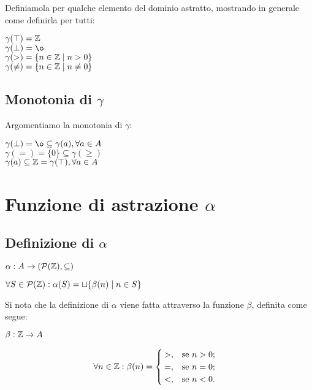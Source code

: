 \documentclass[a4paper, 12pt, oneside,fleqn]{book}
\begin{document}
Definiamola per qualche elemento del dominio astratto, mostrando in generale come definirla per tutti:
\begin{center}
	$ \gamma(\top) = \mathbb{Z} $ \\
	$ \gamma(\bot) = \o $ \\
	$ \gamma(>) = \{ n \in \mathbb{Z} \mid n > 0 \} $ \\
	$ \gamma(\neq) = \{ n \in \mathbb{Z} \mid n \neq 0 \} $
\end{center}

\subsection{Monotonia di $\gamma$}
Argomentiamo la monotonia di $\gamma$:
\begin{center}
	$ \gamma(\bot) = \o \subseteq \gamma(a) , \forall a \in A $ \\
	$ \gamma(=) = \{0\} \subseteq \gamma(\geq) $ \\
	$ \gamma(a) \subseteq \mathbb{Z} = \gamma(\top), \forall a \in A $
\end{center}

\section{Funzione di astrazione $\alpha$}

\subsection{Definizione di $\alpha$}
\begin{center}
	$ \alpha : A \rightarrow (\mathcal{P}{(\mathbb{Z}), \subseteq)} $
\end{center}
\begin{center}
	$ \forall S \in \mathcal{P}(\mathbb{Z}) : \alpha(S) = \sqcup \{ \beta(n) \mid n \in S \} $
\end{center}
Si nota che la definizione di $\alpha$ viene fatta attraverso la funzione $\beta$, definita come segue:
\begin{center}
	$ \beta: \mathbb{Z} \rightarrow A  $
\end{center}

\begin{align*}
	\forall n \in \mathbb{Z}: \beta(n) &=
	\begin{cases}
		>,	&\text{se $n  >  0$;} \\
		=,	&\text{se $n = 0$;} \\
		<,	&\text{se $n < 0$.}
	\end{cases} 
\end{align*}
\end{document}
